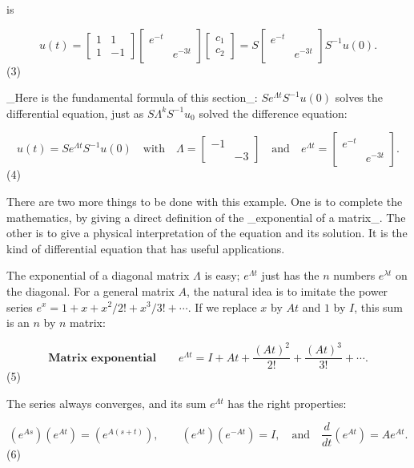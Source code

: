 is

\[u(t)=\begin{bmatrix}1&1\\ 1&-1\end{bmatrix}\begin{bmatrix}e^{-t}\\ &e^{-3t}\end{bmatrix}\begin{bmatrix}c_{1}\\ c_{2}\end{bmatrix}=S\begin{bmatrix}e^{-t}\\ &e^{-3t}\end{bmatrix}S^{-1}u(0).\] (3)

_Here is the fundamental formula of this section_: \(Se^{\Lambda t}S^{-1}u(0)\) solves the differential equation, just as \(S\Lambda^{k}S^{-1}u_{0}\) solved the difference equation:

\[u(t)=Se^{\Lambda t}S^{-1}u(0)\quad\text{with}\quad\Lambda=\begin{bmatrix}-1\\ &-3\end{bmatrix}\quad\text{and}\quad e^{\Lambda t}=\begin{bmatrix}e^{-t}\\ &e^{-3t}\end{bmatrix}.\] (4)

There are two more things to be done with this example. One is to complete the mathematics, by giving a direct definition of the _exponential of a matrix_. The other is to give a physical interpretation of the equation and its solution. It is the kind of differential equation that has useful applications.

The exponential of a diagonal matrix \(\Lambda\) is easy; \(e^{\Lambda t}\) just has the \(n\) numbers \(e^{\lambda t}\) on the diagonal. For a general matrix \(A\), the natural idea is to imitate the power series \(e^{x}=1+x+x^{2}/2!+x^{3}/3!+\cdots\). If we replace \(x\) by \(At\) and \(1\) by \(I\), this sum is an \(n\) by \(n\) matrix:

\[\textbf{Matrix exponential}\qquad e^{\Lambda t}=I+At+\frac{(At)^{2}}{2!}+ \frac{(At)^{3}}{3!}+\cdots.\] (5)

The series always converges, and its sum \(e^{\Lambda t}\) has the right properties:

\[(e^{As})(e^{At})=(e^{A(s+t)}),\qquad(e^{At})(e^{-At})=I,\quad\text{and}\quad \frac{d}{dt}(e^{At})=Ae^{At}.\] (6)

